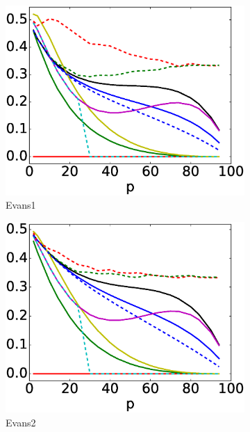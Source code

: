 \begin{figure}[h]
	\begin{subfigure}{0.31\textwidth}
		\includegraphics[width=\linewidth]{img/ExpectedNodes/2Cliques/2Clique_Evans1.eps}
		\caption{\label{fig:2CE1}Evans1}		
	\end{subfigure}
	\begin{subfigure}{0.31\textwidth}
		\includegraphics[width=\linewidth]{img/ExpectedNodes/2Cliques/2Clique_Evans2.eps}
		\caption{\label{fig:2CE2}Evans2}		
	\end{subfigure}
	\begin{subfigure}{0.31\textwidth}

\end{subfigure}
\end{figure}

